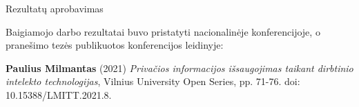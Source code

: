\begin{frame}[c]{Rezultatų aprobavimas}
 
\par Baigiamojo darbo rezultatai buvo pristatyti nacionalinėje konferencijoje, o pranešimo tezės publikuotos konferencijos leidinyje:

\item {\bf Paulius Milmantas} (2021) {\it Privačios informacijos išsaugojimas taikant dirbtinio intelekto technologijas}, Vilnius University Open Series, pp. 71-76. doi: 10.15388/LMITT.2021.8.

\end{frame}